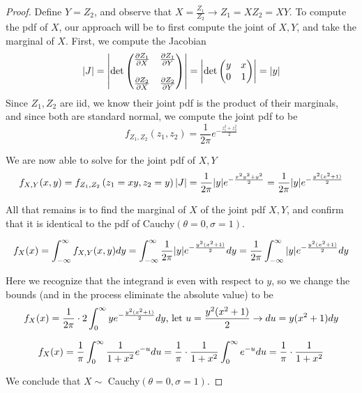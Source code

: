 \documentclass{exam}
\begin{document}
\begin{questions}
\begin{proof}
    Define $Y = Z_2$, and observe that $X = \frac{Z_1}{Z_2}\rightarrow Z_1 = XZ_2 = XY$. To compute the pdf of $X$, our approach will be to first compute the joint of $X, Y$, and take the marginal of $X$. First, we compute the Jacobian
    $$|J| = \left| \det \left( \begin{matrix}
        \frac{\partial Z_1}{\partial X} & \frac{\partial Z_1}{\partial Y} \\
        \\
        \frac{\partial Z_2}{\partial X} & \frac{\partial Z_2}{\partial Y} \\
    \end{matrix} \right) \right| = \left| \det \left( \begin{matrix}
        y & x \\
        0 & 1 \\
    \end{matrix} \right) \right| = |y|$$
    Since $Z_1, Z_2$ are iid, we know their joint pdf is the product of their marginals, and since both are standard normal, we compute the joint pdf to be
    $$f_{Z_1, Z_2}(z_1, z_2) = \frac{1}{2\pi}e^{-\frac{z_1^2 + z_2^2}{2}}$$

    We are now able to solve for the joint pdf of $X, Y$
    $$f_{X, Y}(x, y) = f_{Z_1, Z_2}\left( z_1 = xy, z_2 = y \right)|J| = \frac{1}{2\pi}|y|e^{-\frac{x^2y^2 + y^2}{2}} = \frac{1}{2\pi}|y|e^{-\frac{y^2(x^2 + 1)}{2}}$$

    All that remains is to find the marginal of $X$ of the joint pdf $X, Y$, and confirm that it is identical to the pdf of Cauchy$(\theta = 0, \sigma = 1)$.

    $$f_X(x) = \int_{-\infty}^\infty f_{X, Y}(x, y) dy = \int_{-\infty}^\infty \frac{1}{2\pi}|y|e^{-\frac{y^2(x^2 + 1)}{2}} dy = \frac{1}{2\pi}\int_{-\infty}^\infty |y| e^{-\frac{y^2(x^2 + 1)}{2}}dy$$

    Here we recognize that the integrand is even with respect to $y$, so we change the bounds (and in the process eliminate the absolute value) to be
    $$f_X(x) = \frac{1}{2\pi}\cdot 2\int_0^\infty ye^{-\frac{y^2(x^2 + 1)}{2}}dy \text{, let }u = \frac{y^2(x^2 + 1)}{2} \rightarrow du = y(x^2 + 1) dy$$

    $$f_X(x) = \frac{1}{\pi}\int_0^\infty \frac{1}{1 + x^2} e^{-u}du = \frac{1}{\pi}\cdot \frac{1}{1 + x^2}\int_0^\infty e^{-u}du = \frac{1}{\pi}\cdot \frac{1}{1 + x^2}$$

    We conclude that $X\sim$ Cauchy$(\theta = 0, \sigma = 1)$.
\end{proof}

\newpage
\end{questions}
\end{document}
